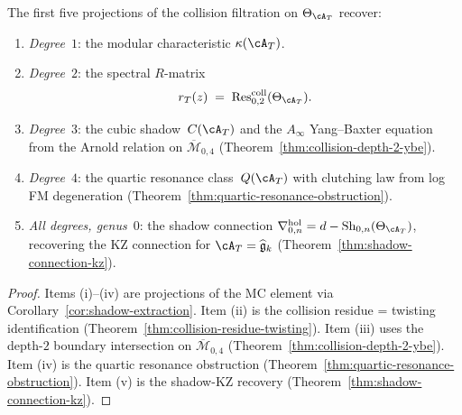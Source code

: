\begin{proposition}
\label{prop:ht-five-shadow-synthesis}
The first five projections of the collision filtration on
$\Theta_{\cA_T}$ recover:
\begin{enumerate}[label=\textup{(\roman*)}]
\item \emph{Degree~$1$}: the modular characteristic
 $\kappa(\cA_T)$.
\item \emph{Degree~$2$}: the spectral $R$-matrix
 \begin{equation}\label{eq:ht-r-matrix-collision}
 r_T(z)
 \;=\; \operatorname{Res}^{\mathrm{coll}}_{0,2}(\Theta_{\cA_T}).
 \end{equation}
\item \emph{Degree~$3$}: the cubic shadow~$C(\cA_T)$ and the
 $A_\infty$ Yang--Baxter equation from the Arnold relation on
 $\overline{\mathcal{M}}_{0,4}$
 \textup{(}Theorem~\textup{\ref{thm:collision-depth-2-ybe}}\textup{)}.
\item \emph{Degree~$4$}: the quartic resonance
 class~$Q(\cA_T)$ with clutching law from log FM degeneration
 \textup{(}Theorem~\textup{\ref{thm:quartic-resonance-obstruction}}\textup{)}.
\item \emph{All degrees, genus~$0$}: the shadow connection
 $\nabla^{\mathrm{hol}}_{0,n} = d -
 \operatorname{Sh}_{0,n}(\Theta_{\cA_T})$, recovering the
 KZ connection for $\cA_T = \widehat{\mathfrak{g}}_k$
 \textup{(}Theorem~\textup{\ref{thm:shadow-connection-kz}}\textup{)}.
\end{enumerate}
\end{proposition}

\begin{proof}
Items (i)--(iv) are projections of the MC element via
Corollary~\ref{cor:shadow-extraction}. Item (ii) is the
collision residue = twisting identification
(Theorem~\ref{thm:collision-residue-twisting}). Item (iii) uses
the depth-$2$ boundary intersection on
$\overline{\mathcal{M}}_{0,4}$
(Theorem~\ref{thm:collision-depth-2-ybe}).
Item (iv) is the quartic resonance obstruction
(Theorem~\ref{thm:quartic-resonance-obstruction}).
Item (v) is the shadow-KZ recovery
(Theorem~\ref{thm:shadow-connection-kz}).
\end{proof}

